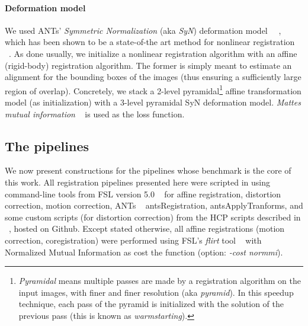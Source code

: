 \paragraph{Deformation model}
We used ANTs' \textit{Symmetric Normalization} (aka \textit{SyN})
deformation model ~~\citep{avants2008,avants2011}, which has been shown
to be a state-of-the art method for nonlinear registration
~\citep{pmid19195496}. As done usually, we initialize a nonlinear
registration algorithm with an affine (rigid-body) registration
algorithm.
%
The former is simply meant to estimate an alignment for the
bounding boxes of the images (thus ensuring a sufficiently large
region of overlap). Concretely, we stack a 2-level
pyramidal\footnote{\textit{Pyramidal} means multiple passes are
made by a registration algorithm on the input images, with finer
and finer resolution (aka \textit{pyramid}). In this speedup technique, each
pass of the pyramid is initialized with the solution of the
previous pass (this is known as \textit{warmstarting}).}  affine
transformation model (as initialization) with a 3-level pyramidal
SyN deformation model. \textit{Mattes mutual information}
~\citep{mattes2003} is used as the loss function.


\subsection{The pipelines}
\label{sec:pipelines}
We now present constructions for the pipelines whose benchmark is the
core of this work. All registration pipelines presented here were
scripted in using command-line tools from FSL version 5.0
~\citep{smith2004} for affine registration, distortion correction,
motion correction, ANTs ~\citep{avants2009advanced}
antsRegistration, antsApplyTranforms, and some custom scripts
(for distortion correction) from the HCP scripts described in
~\citep{glasser2013}, hosted on Github.
Except stated otherwise, all affine registrations (motion correction,
coregistration) were performed using FSL's \textit{flirt} tool
~\citep{smith2004} with Normalized Mutual Information as cost the function (option: \textit{-cost
  normmi}).

